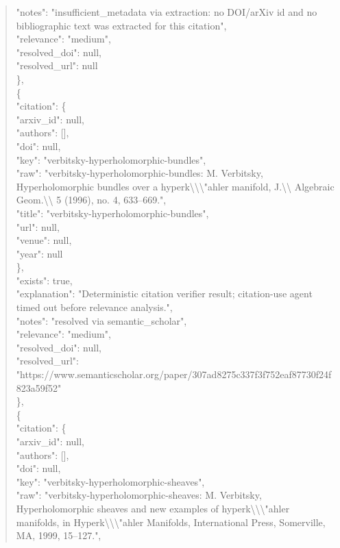 \documentclass[11pt]{article}
\begin{document}
\begin{quote}
      "notes": "insufficient\_metadata via extraction: no DOI/arXiv id and no bibliographic text was extracted for this citation",\\
      "relevance": "medium",\\
      "resolved\_doi": null,\\
      "resolved\_url": null\\
    \},\\
    \{\\
      "citation": \{\\
        "arxiv\_id": null,\\
        "authors": [],\\
        "doi": null,\\
        "key": "verbitsky-hyperholomorphic-bundles",\\
        "raw": "verbitsky-hyperholomorphic-bundles: M. Verbitsky, Hyperholomorphic bundles over a hyperk\textbackslash{}\textbackslash{}\textbackslash{}"ahler manifold, J.\textbackslash{}\textbackslash{} Algebraic Geom.\textbackslash{}\textbackslash{} 5 (1996), no. 4, 633--669.",\\
        "title": "verbitsky-hyperholomorphic-bundles",\\
        "url": null,\\
        "venue": null,\\
        "year": null\\
      \},\\
      "exists": true,\\
      "explanation": "Deterministic citation verifier result; citation-use agent timed out before relevance analysis.",\\
      "notes": "resolved via semantic\_scholar",\\
      "relevance": "medium",\\
      "resolved\_doi": null,\\
      "resolved\_url": "https://www.semanticscholar.org/paper/307ad8275c337f3f752eaf87730f24f823a59f52"\\
    \},\\
    \{\\
      "citation": \{\\
        "arxiv\_id": null,\\
        "authors": [],\\
        "doi": null,\\
        "key": "verbitsky-hyperholomorphic-sheaves",\\
        "raw": "verbitsky-hyperholomorphic-sheaves: M. Verbitsky, Hyperholomorphic sheaves and new examples of hyperk\textbackslash{}\textbackslash{}\textbackslash{}"ahler manifolds, in Hyperk\textbackslash{}\textbackslash{}\textbackslash{}"ahler Manifolds, International Press, Somerville, MA, 1999, 15--127.",\\

\end{quote}
\end{document}
